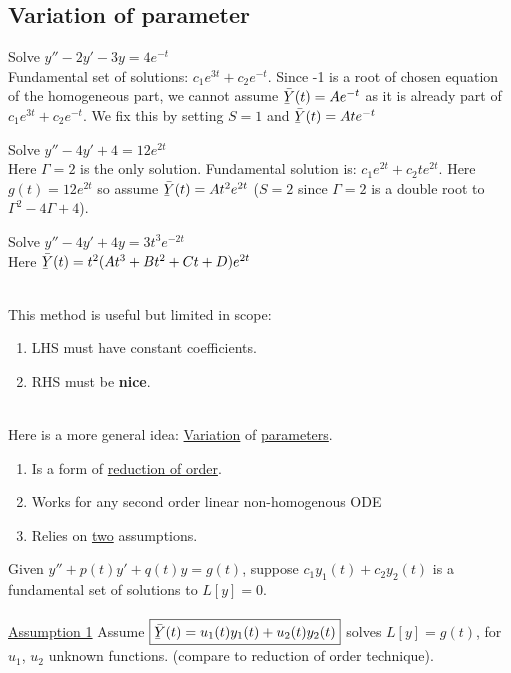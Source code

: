\subsection*{Variation of parameter}
\begin{example-N}
	Solve $y'' - 2y' -3y = 4e^{-t}$\\
	Fundamental set of solutions: $c_1e^{3t} + c_2e^{-t}$. Since -1 is a root of chosen equation of the homogeneous part, we cannot assume $\Ylines(t) = Ae^{-t}$ as it is already part of $c_1e^{3t} + c_2e^{-t}$. We fix this by setting $S = 1$ and $\Ylines(t) = Ate^{-t}$
\end{example-N}
\redhline
\begin{example-N}
	Solve $y'' - 4y' + 4 = 12e^{2t}$\\
	Here $\Gamma = 2$ is the only solution. Fundamental solution is: $c_1e^{2t} + c_2te^{2t}$. Here $g(t) = 12e^{2t}$ so assume $\Ylines(t) = At^2e^{2t}$ ($S = 2$ since $\Gamma = 2$ is a double root to $\Gamma^2 - 4\Gamma + 4$).
\end{example-N}
\redhline
\begin{example-N}
	Solve $y'' - 4y' + 4y = 3t^3e^{-2t}$\\
	Here $\Ylines(t) = t^2(At^3 + Bt^2 + Ct + D)e^{2t}$
\end{example-N}
\redhline\\
This method is useful but limited in scope:
\begin{enumerate}[label=\protect\circled{\arabic*}]
	\item LHS must have constant coefficients.
	\item RHS must be \textbf{nice}.
\end{enumerate}
\redhline\\
Here is a more general idea: \underline{Variation} of \underline{parameters}.
\begin{enumerate}[label=\protect\circled{\arabic*}]
	\item Is a form of \underline{reduction of order}.
	\item Works for any second order linear non-homogenous ODE
	\item Relies on \underline{two} assumptions.		
\end{enumerate}
Given $y'' + p(t)y' + q(t)y = g(t)$, suppose $c_1y_1(t) + c_2y_2(t)$ is a fundamental set of solutions to $L[y] = 0$.\\\\
\underline{Assumption 1} Assume $\boxed{\Ylines(t) = u_1(t)y_1(t) + u_2(t)y_2(t)}$ solves $L[y] = g(t)$, for $u_1$, $u_2$ unknown functions. (compare to reduction of order technique).
